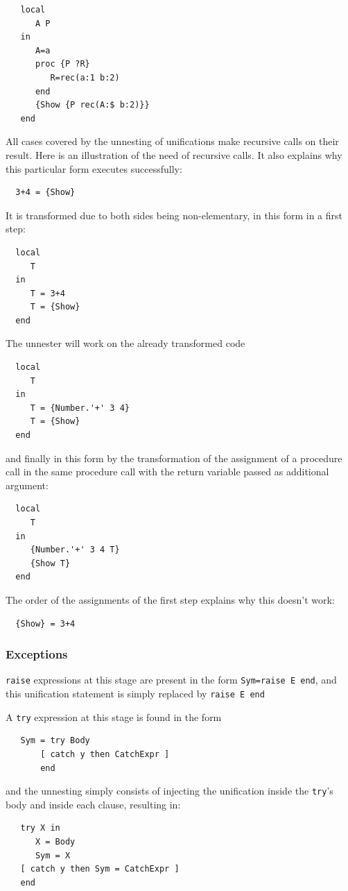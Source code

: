 \documentclass[a4paper]{memoir}
\begin{document}
\begin{lstlisting}
   local
      A P
   in
      A=a
      proc {P ?R}
         R=rec(a:1 b:2)
      end
      {Show {P rec(A:$ b:2)}}
   end
\end{lstlisting}


All cases covered by the unnesting of unifications make recursive calls on their
result.
Here is an illustration of the need of recursive calls. It also explains why
this particular form executes successfully:
\begin{lstlisting}
  3+4 = {Show}
\end{lstlisting}
\pagebreak[4]
It is transformed due to both sides being non-elementary, in this form in a first step:
\begin{lstlisting}
  local
     T
  in
     T = 3+4
     T = {Show}
  end
\end{lstlisting}
The unnester will work on the already transformed code
\begin{lstlisting}
  local
     T
  in
     T = {Number.'+' 3 4}
     T = {Show}
  end
\end{lstlisting}
and finally in this form by the transformation of the assignment of a procedure call in the same procedure call with the return variable passed as additional argument:
\begin{lstlisting}
  local
     T
  in
     {Number.'+' 3 4 T}
     {Show T}
  end
\end{lstlisting}
The order of the assignments of the first step explains why this doesn't work:
\begin{lstlisting}
  {Show} = 3+4
\end{lstlisting}

\subsubsection{Exceptions}\label{sec:arch:unnester:exceptions}
\lstinline!raise! expressions at this stage are present in the form
\lstinline!Sym=raise E end!, and this unification statement is simply replaced by
\lstinline!raise E end! 

A \lstinline!try! expression at this stage is found in the form 
\begin{lstlisting}
   Sym = try Body 
       [ catch y then CatchExpr ] 
       end
\end{lstlisting}
and the unnesting simply consists of injecting the unification inside the
\lstinline!try!'s body and inside each clause, resulting in:
\begin{lstlisting}
   try X in 
      X = Body 
      Sym = X 
   [ catch y then Sym = CatchExpr ] 
   end
\end{lstlisting}
\end{document}
